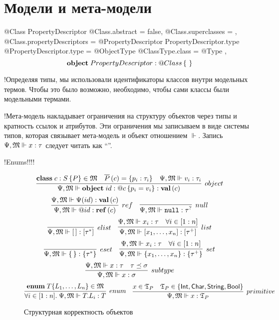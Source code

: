 \section{Модели и мета-модели}

  @Class PropertyDescriptor {
    @Class.abstract = false,
    @Class.superclasses = {},
    @Class.propertyDescriptors = {
      @PropertyDescriptor PropertyDescriptor.type {
        @PropertyDescriptor.type = @ObjectType { @ClassType.class = @Type }
      }
    }
  },
$$
\mathbf{object}\;PropertyDescriptor : @Class\left\{ \mbox{
} \right\}
$$

!Определяя типы, мы использовали идентификаторы классов внутри модельных термов. Чтобы это было возможно, необходимо, чтобы сами классы были модельными термами.

!Мета-модель накладывает ограничения на структуру объектов через типы и кратность ссылок и атрибутов. Эти ограничения мы записываем в виде системы типов, которая связывает мета-модель и объект отношением $\Vdash$. Запись $\Psi, \mathfrak{M} \Vdash x : \tau$ следует читать как ``''.

!Enums!!!!

\begin{figure}[htbp]
	\centering
$$
	\infer[object]{
		\fromMM \Object{id}{\Ref{c}}{p_i = v_i} : \ClassT{c}
	}{
		\Class{c}{S}{P} \in \MM{M}&
		\AllProps{c} = \{p_i : \tau_i\}&
		\fromMM v_i : \tau_i
	}
$$
$$
\infer[ref]{
	\fromMM \Ref{id} : \RefT{c}
}{
	\fromMM \RContext(id) : \ClassT{c}
}
\quad
\infer[null]{
	\fromMM \Null : \NullableT{\tau}
}{}
$$
$$
\infer[elist]{
	\fromMM \List{\,} : \ListT{\tau^*}
}{}
\quad
\infer[list]{
	\fromMM \List{x_1, \ldots, x_n} : \List{\tau^+}
}{
	\fromMM x_i : \tau & \forall i\in[1:n]
}
$$
$$
\infer[eset]{
	\fromMM \Set{\,} : \SetT{\tau^*}
}{}
\quad
\infer[set]{
	\fromMM \Set{x_1, \ldots, x_n} : \SetT{\tau^+}
}{
	\fromMM x_i : \tau & \forall i\in[1:n]
}
$$
$$
\infer[subtype]{
	\fromMM x : \sigma
}{
	\fromMM x : \tau &
	\tau \subtype \sigma
}
$$
$$
\infer[enum]{
	\forall i \in [1:n]. \; \fromMM T.L_i : T
}{
	\mathbf{enum}\;T\{L_1,\ldots,L_n\} \in \MM{M}
}
\quad
\infer[primitive]{
	\fromMM x : \Types_P
}{
	x \in \Types_P & 
	\Types_P \in \{\IntegerT, \CharT, \StringT, \BooleanT\}
}
$$
	\caption{Структурная корректность объектов}\label{TypesMM}
\end{figure}


